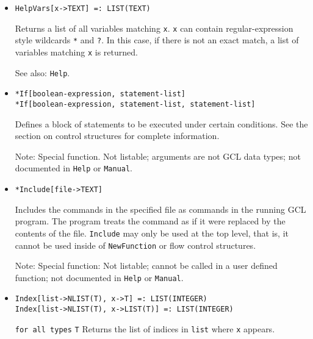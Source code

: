 \begin{itemize}
\item{}
\protect \large \begin{verbatim}
HelpVars[x->TEXT] =: LIST(TEXT) 
\end{verbatim}\normalsize

\bd 
Returns a list of all variables matching \verb+x+.  \verb+x+ can
contain regular-expression style wildcards \verb+*+ and \verb+?+. 
In this case,
if there is not an exact match, a list of variables matching \verb+x+
is returned.
\item [See also:] \verb+Help+.
\ed


\item{} 
\protect \large \begin{verbatim}
*If[boolean-expression, statement-list]
*If[boolean-expression, statement-list, statement-list]
\end{verbatim} \normalsize
  
\bd
Defines a block of statements to be executed under certain conditions.
See the section on control structures for complete information. 
\item [Note:] Special function.  Not listable; arguments are not GCL
data types; not documented in \verb+Help+ or \verb+Manual+.  
\ed


\item{}
\protect \large \begin{verbatim}
*Include[file->TEXT]
\end{verbatim}\normalsize

\bd
Includes the commands in the specified file as commands
in the running GCL program.  The program treats the command as if it
were replaced by the contents of the file.  \verb+Include+ may only be used
at the top level, that is, it cannot be used inside of \verb+NewFunction+
or flow control structures.
\item [Note:] Special function:  Not listable; cannot be called in a
user defined function; not documented in \verb+Help+ or \verb+Manual+. 
\ed


\item{}
\protect \large \begin{verbatim}
Index[list->NLIST(T), x->T] =: LIST(INTEGER) 
Index[list->NLIST(T), x->LIST(T)] =: LIST(INTEGER) 
\end{verbatim} \normalsize

{\tt for all types} {\tt T}
\bd
Returns the list of indices in \verb+list+ where \verb+x+ appears.
\ed


\end{itemize}
